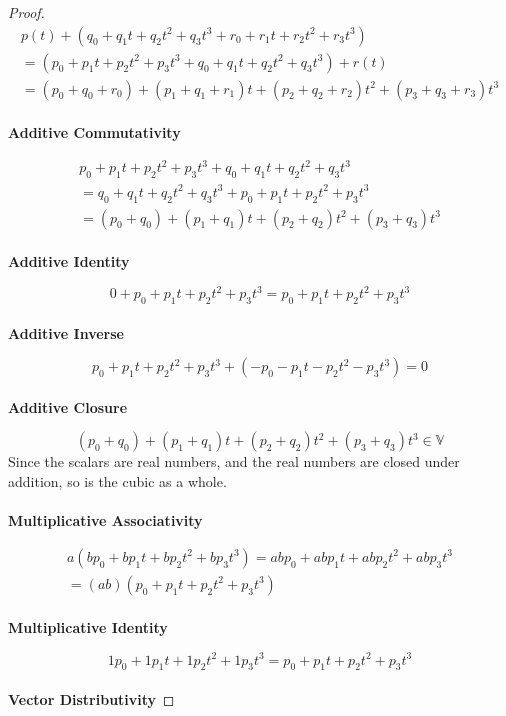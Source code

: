 \documentclass[]{article}
\numberwithin{equation}{section}
\begin{document}
\begin{proof}
\begin{align}
	p(t) + (q_0 + q_1 t + q_2 t^2 + q_3 t^3 + r_0 + r_1 t + r_2 t^2 + r_3 t^3) \\
	= (p_0 + p_1 t + p_2 t^2 + p_3 t^3 + q_0 + q_1 t + q_2 t^2 + q_3 t^3) + r(t) \\
	= (p_0 + q_0 + r_0) + (p_1 + q_1 + r_1) t + (p_2 + q_2 + r_2) t^2 + (p_3 + q_3 + r_3) t^3
\end{align}
\\
\textbf{Additive Commutativity}

\begin{align}
	p_0 + p_1 t + p_2 t^2 + p_3 t^3 + q_0 + q_1 t + q_2 t^2 + q_3 t^3 \\
	= q_0 + q_1 t + q_2 t^2 + q_3 t^3 + p_0 + p_1 t + p_2 t^2 + p_3 t^3 \\
	= (p_0 + q_0) + (p_1 + q_1) t + (p_2 + q_2) t^2 + (p_3 + q_3) t^3
\end{align}
\\
\textbf{Additive Identity}

\begin{equation}
	0 + p_0 + p_1 t + p_2 t^2 + p_3 t^3 = p_0 + p_1 t + p_2 t^2 + p_3 t^3
\end{equation}
\\
\textbf{Additive Inverse}

\begin{equation}
	p_0 + p_1 t + p_2 t^2 + p_3 t^3 + (-p_0 - p_1 t - p_2 t^2 - p_3 t^3) = 0
\end{equation}
\\
\textbf{Additive Closure}

\begin{equation}
	(p_0 + q_0) + (p_1 + q_1) t + (p_2 + q_2) t^2 + (p_3 + q_3) t^3 \in \mathbb{V}
\end{equation}
Since the scalars are real numbers, and the real numbers are closed under addition, so is the cubic as a whole. \\
\\
\textbf{Multiplicative Associativity}

\begin{align}
	a(bp_0 + bp_1 t + bp_2 t^2 + bp_3 t^3) = ab p_0 + ab p_1 t + ab p_2 t^2 + ab p_3 t^3 \\
	= (ab) (p_0 + p_1 t + p_2 t^2 + p_3 t^3)
\end{align}
\\
\textbf{Multiplicative Identity}

\begin{equation}
	1 p_0 + 1 p_1 t + 1 p_2 t^2 + 1 p_3 t^3 = p_0 + p_1 t + p_2 t^2 + p_3 t^3
\end{equation}
\\
\textbf{Vector Distributivity}


\end{proof}
\end{document}
